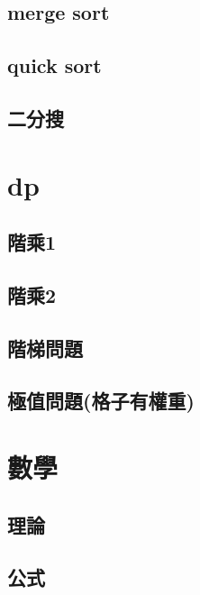     \subsection{merge sort}
          
    \subsection{quick sort}
        
    \subsection{二分搜}
        
\section{dp}
    \subsection{階乘1}
        
    \subsection{階乘2}
        
    \subsection{階梯問題}
        
     \subsection{極值問題(格子有權重)}
        
\section{數學}
    \subsection{理論}
        
    \subsection{公式}
        

